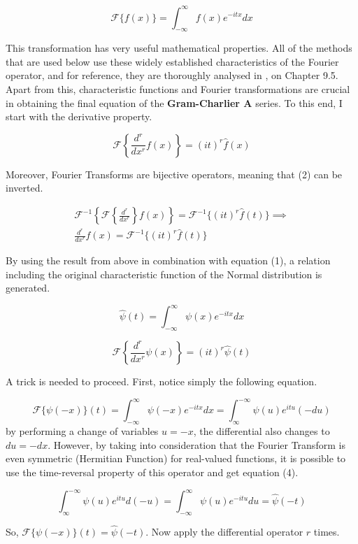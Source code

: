 \[ 
\mathcal{F} \{ f(x) \} = \int_{-\infty}^{\infty} f(x) e^{-itx} dx
\]

This transformation has very useful mathematical properties. All of the methods that are used below use these widely established characteristics of the Fourier operator, and for reference, they are thoroughly analysed in \cite{herman2015introduction}, on Chapter 9.5. Apart from this, characteristic functions and Fourier transformations are crucial in obtaining the final equation of the \textbf{Gram-Charlier A} series. To this end, I start with the derivative property.

\[
\mathcal{F} \left\{ \frac{d^r}{dx^r} f(x) \right\} = (it)^r \hat{f}(x) \tag{2}
\]

Moreover, Fourier Transforms are bijective operators, meaning that (2) can be inverted.

\begin{gather*}
	\mathcal{F}^{-1} \left\{ \mathcal{F} \left\{ \frac{d^r}{dx^r} \right\} f(x) \right\} = \mathcal{F}^{-1} \{(it)^r \hat{f}(t)\} \implies \\
	\frac{d^r}{dx^r} f(x) = \mathcal{F}^{-1} \{ (it)^r \hat{f}(t) \}
\end{gather*}

By using the result from above in combination with equation (1), a relation including the original characteristic function of the Normal distribution is generated.

\[
	\hat{\psi}(t) = \int_{-\infty}^{\infty} \psi(x) e^{-itx} dx
\]

\[
\mathcal{F} \left\{ \frac{d^r}{dx^r} \psi(x) \right\} = (it)^r \hat{\psi}(t) \tag{3}
\]

A trick is needed to proceed. First, notice simply the following equation.

\[
	\mathcal{F} \{\psi(-x)\}(t) = \int_{-\infty}^{\infty} \psi(-x) e^{-itx}dx = \int_{\infty}^{-\infty} \psi(u) e^{itu} (-du)
\]
by performing a change of variables $u = -x$, the differential also changes to $du = -dx$. However, by taking into consideration that the Fourier Transform is even symmetric (Hermitian Function) for real-valued functions, it is possible to use the time-reversal property of this operator and get equation (4).

\[
\int_{\infty}^{-\infty} \psi(u) e^{itu} d(-u) = \int_{-\infty}^{\infty} \psi(u) e^{-itu}du = \hat{\psi}(-t) \tag{4}
\]

So, $\mathcal{F}\{ \psi(-x) \}(t) = \hat{\psi}(-t)$. Now apply the differential operator $r$ times.

